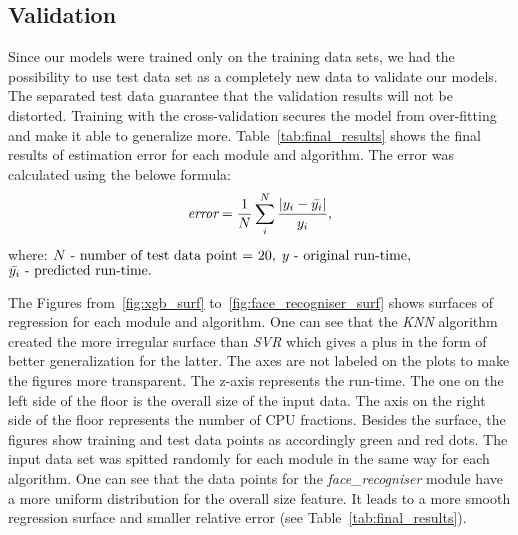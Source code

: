 \subsection{Validation}
Since our models were trained only on the training data sets, we had the possibility to use test data set as a completely new data to validate our models. The separated test data guarantee that the validation results will not be distorted. Training with the cross-validation secures the model from over-fitting and make it able to generalize more. Table~\ref{tab:final_results} shows the final results of estimation error for each module and algorithm. The error was calculated using the belowe formula:
\[ \textit{error} = \frac{1}{N}\sum_i^N \frac{|y_i-\bar{y_i}|}{y_i}  \textnormal{,}\]
where: \newline
$ N  \textnormal{ - number of test data point = 20,} $\newline
$ y  \textnormal{ - original run-time,} $ \newline
$ \bar{y_i}  \textnormal{ - predicted run-time.} $

The Figures from~\ref{fig:xgb_surf} to~\ref{fig:face_recogniser_surf} shows surfaces of regression for each module and algorithm. One can see that the \textit{KNN} algorithm created the more irregular surface than \textit{SVR} which gives a plus in the form of better generalization for the latter. The axes are not labeled on the plots to make the figures more transparent. The z-axis represents the run-time. The one on the left side of the floor is the overall size of the input data. The axis on the right side of the floor represents the number of CPU fractions. Besides the surface, the figures show training and test data points as accordingly green and red dots. The input data set was spitted randomly for each module in the same way for each algorithm. One can see that the data points for the \textit{face\_recogniser} module have a more uniform distribution for the overall size feature. It leads to a more smooth regression surface and smaller relative error (see Table~\ref{tab:final_results}).
